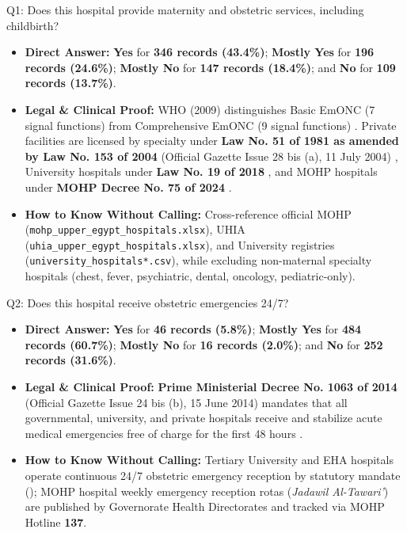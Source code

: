 \documentclass[10pt,a4paper]{article}
\begin{document}
\begin{qabox}{Q1: Does this hospital provide maternity and obstetric services, including childbirth?}
\begin{itemize}
    \item \textbf{Direct Answer:} \textbf{Yes} for \textbf{346 records (43.4\%)}; \textbf{Mostly Yes} for \textbf{196 records (24.6\%)}; \textbf{Mostly No} for \textbf{147 records (18.4\%)}; and \textbf{No} for \textbf{109 records (13.7\%)}.
    \item \textbf{Legal \& Clinical Proof:} WHO (2009) distinguishes Basic EmONC (7 signal functions) from Comprehensive EmONC (9 signal functions) \cite{who2009emonc}. Private facilities are licensed by specialty under \textbf{Law No. 51 of 1981 as amended by Law No. 153 of 2004} (Official Gazette Issue 28 bis (a), 11 July 2004) \cite{egypt_law_51_1981_153_2004}, University hospitals under \textbf{Law No. 19 of 2018} \cite{egypt_law_19_2018_univ}, and MOHP hospitals under \textbf{MOHP Decree No. 75 of 2024} \cite{egypt_mohp_decree_75_2024}.
    \item \textbf{How to Know Without Calling:} Cross-reference official MOHP (\texttt{mohp\_upper\_egypt\_hospitals.xlsx}), UHIA (\texttt{uhia\_upper\_egypt\_hospitals.xlsx}), and University registries (\texttt{university\_hospitals*.csv}), while excluding non-maternal specialty hospitals (chest, fever, psychiatric, dental, oncology, pediatric-only).
\end{itemize}
\end{qabox}

\begin{qabox}{Q2: Does this hospital receive obstetric emergencies 24/7?}
\begin{itemize}
    \item \textbf{Direct Answer:} \textbf{Yes} for \textbf{46 records (5.8\%)}; \textbf{Mostly Yes} for \textbf{484 records (60.7\%)}; \textbf{Mostly No} for \textbf{16 records (2.0\%)}; and \textbf{No} for \textbf{252 records (31.6\%)}.
    \item \textbf{Legal \& Clinical Proof:} \textbf{Prime Ministerial Decree No. 1063 of 2014} (Official Gazette Issue 24 bis (b), 15 June 2014) mandates that all governmental, university, and private hospitals receive and stabilize acute medical emergencies free of charge for the first 48 hours \cite{egypt_pm_decree_1063_2014}.
    \item \textbf{How to Know Without Calling:} Tertiary University and EHA hospitals operate continuous 24/7 obstetric emergency reception by statutory mandate (\cite{egypt_law_19_2018_univ,egypt_law_2_2018_uhia}); MOHP hospital weekly emergency reception rotas (\textit{Jadawil Al-Tawari'}) are published by Governorate Health Directorates and tracked via MOHP Hotline \textbf{137}.
\end{itemize}
\end{qabox}
\end{document}
